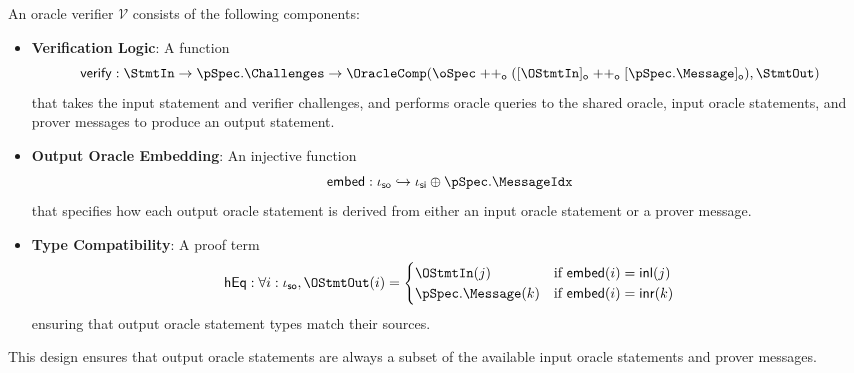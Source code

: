 \begin{definition}
    \label{def:oracle_verifier}
    An oracle verifier $\mathcal{V}$ consists of the following components:

    \begin{itemize}
        \item \textbf{Verification Logic}: A function
        \[ \mathsf{verify} : \StmtIn \to \pSpec.\Challenges \to \OracleComp(\oSpec \mathrel{++_\mathsf{o}} ([\OStmtIn]_\mathsf{o} \mathrel{++_\mathsf{o}} [\pSpec.\Message]_\mathsf{o}), \StmtOut) \]
        that takes the input statement and verifier challenges, and performs oracle queries to the shared oracle, input oracle statements, and prover messages to produce an output statement.

        \item \textbf{Output Oracle Embedding}: An injective function
        \[ \mathsf{embed} : \iota_{\mathsf{so}} \hookrightarrow \iota_{\mathsf{si}} \oplus \pSpec.\MessageIdx \]
        that specifies how each output oracle statement is derived from either an input oracle statement or a prover message.

        \item \textbf{Type Compatibility}: A proof term
        \[ \mathsf{hEq} : \forall i : \iota_{\mathsf{so}}, \OStmtOut(i) = \begin{cases}
            \OStmtIn(j) & \text{if } \mathsf{embed}(i) = \mathsf{inl}(j) \\
            \pSpec.\Message(k) & \text{if } \mathsf{embed}(i) = \mathsf{inr}(k)
        \end{cases} \]
        ensuring that output oracle statement types match their sources.
    \end{itemize}

    This design ensures that output oracle statements are always a subset of the available input oracle statements and prover messages.
\end{definition}

